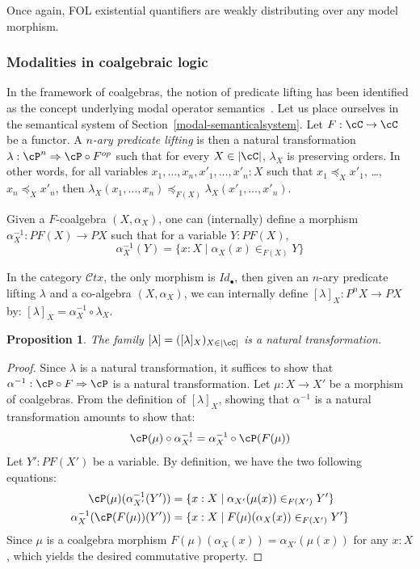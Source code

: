 \documentclass[preprint,3p,times]{elsarticle}
\newtheorem{proposition}[definition]{Proposition}
\newcommand{\Ctx}{\mathcal{C}tx}
\begin{document}
Once again, FOL existential quantifiers are weakly distributing over any model morphism.

\subsubsection{Modalities in coalgebraic logic}
\label{modal:quantifiers}
In the framework of coalgebras, the notion of predicate lifting has been identified as the concept underlying modal operator semantics~\cite{Pat03}. Let us place ourselves in the semantical system of Section~\ref{modal-semanticalsystem}. Let $F : \cC \to \cC$ be a functor. A {\em $n$-ary predicate lifting} is then a natural transformation $\lambda : \cP^n \Rightarrow \cP \circ F^{op}$ such that
for every $X \in |\cC|$, $\lambda_X$ is preserving orders.
In other words, for all variables $x_1,\dots,x_n,x'_1,\ldots,x'_n:X$ such that \(x_1 \preceq_X x'_1\), \ldots, \(x_n \preceq_X x'_n\), then \(\lambda_X(x_1,\ldots,x_n) \preceq_{F(X)} \lambda_X(x'_1,\ldots,x'_n)\).

Given a \(F\)-coalgebra \((X,\alpha_X)\), one can (internally) define a morphism \(\alpha^{-1}_X: PF(X) \to PX\) such that for a variable \(Y:PF(X)\),
\[
    \alpha^{-1}_X(Y) = \{x:X \mid \alpha_X(x) \in_{F(X)} Y\}
\]

In the category $\Ctx$, the only morphism is $Id_{\bullet}$, then given an $n$-ary predicate lifting $\lambda$ and a co-algebra $(X,\alpha_X)$, we can internally define $[\lambda]_X : P^nX \to PX$ by: $[\lambda]_X = \alpha^{-1}_X \circ \lambda_X$. 

\begin{proposition}
The family $[\lambda] = ([\lambda]_X)_{X \in |\cC|}$ is a natural transformation. 
\end{proposition}

\begin{proof}
Since \(\lambda\) is a natural transformation, it suffices to show that $\alpha^{-1} : \cP \circ F \Rightarrow \cP$ is a natural transformation. Let $\mu : X \to X'$ be a morphism of coalgebras. From the definition of $[\lambda]_X$, showing that $\alpha^{-1}$ is a natural transformation amounts to show that: 
$$\cP(\mu) \circ \alpha^{-1}_{X'} = \alpha^{-1}_X \circ \cP(F(\mu))$$
Let $Y':PF(X')$ be a variable. By definition, we have the two following equations:
\begin{align*}
\cP(\mu)(\alpha^{-1}_{X'}(Y')) &= \{x:X \mid \alpha_{X'}(\mu(x)) \in_{F(X')} Y'\} \\
\alpha^{-1}_X(\cP(F(\mu))(Y')) &= \{x:X \mid F(\mu)(\alpha_X(x)) \in_{F(X')} Y'\}
\end{align*}
Since $\mu$ is a coalgebra morphism \(F(\mu)(\alpha_X(x)) = \alpha_{X'}(\mu(x))\) for any \(x : X\), which yields the desired commutative property.
\end{proof}
\end{document}
